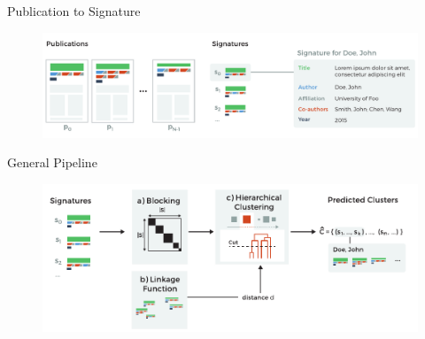 \documentclass{beamer}
\begin{document}

\begin{frame} {Publication to Signature}

\begin{figure}
   \centering
   \includegraphics[width=\textwidth]{./figures/fig-pub-to-signature.pdf}
\end{figure}

\end{frame}


\begin{frame} {General Pipeline}

\begin{figure}
   \centering
   \includegraphics[width=\textwidth]{./figures/fig-workflow.pdf}
\end{figure}

\end{frame}


\end{document}
